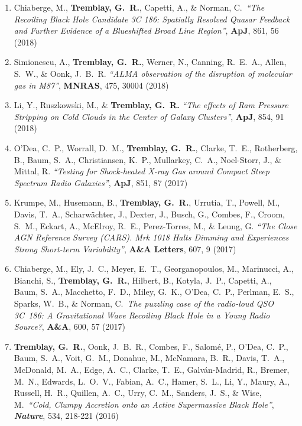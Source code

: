 \documentclass[11pt]{article}
\begin{document}
\begin{enumerate}
\item Chiaberge, M., \textbf{Tremblay, G.~R.}, Capetti, A., \& Norman, C.~\textit{``The Recoiling Black Hole Candidate 3C 186: Spatially Resolved Quasar Feedback and Further Evidence of a Blueshifted Broad Line Region''},
\textbf{ApJ}, 861, 56 (2018)


\item Simionescu, A., \textbf{Tremblay, G.~R.}, Werner, N., Canning, R.~E.~A., Allen, S.~W., \& Oonk, J.~B.~R.
\textit{``ALMA observation of the disruption of
molecular gas in M87''}, \textbf{MNRAS}, 475, 30004 (2018)


\item Li, Y., Ruszkowski, M., \& \textbf{Tremblay, G.~R.} \textit{``The effects of Ram Pressure Stripping on Cold Clouds in the Center of Galaxy Clusters''}, \textbf{ApJ}, 854, 91 (2018)


\item O'Dea, C.~P., Worrall, D.~M., \textbf{Tremblay, G.~R.}, Clarke, T.~E., Rotherberg, B., Baum, S.~A.,
Christiansen, K.~P., Mullarkey, C.~A., Noel-Storr,
J., \& Mittal, R. \textit{``Testing for Shock-heated X-ray Gas around Compact Steep Spectrum Radio Galaxies''}, \textbf{ApJ}, 851, 87 (2017)


\item Krumpe, M., Husemann, B., \textbf{Tremblay, G.~R.}, Urrutia, T., Powell, M., Davis, T.~A., Scharw\"{a}chter, J., Dexter, J., Busch, G., Combes, F., Croom, S.~M.,
Eckart, A., McElroy, R.~E., Perez-Torres, M., \& Leung, G. \textit{``The Close AGN Reference Survey (CARS). Mrk 1018 Halts Dimming and Experiences Strong Short-term Variability''}, \textbf{A\&A Letters}, 607, 9 (2017)



\item Chiaberge, M., Ely, J.~C., Meyer, E.~T., Georganopoulos, M., Marinucci, A., Bianchi, S.,  \textbf{Tremblay, G.~R.}, Hilbert, B.,
Kotyla, J.~P., Capetti, A., Baum, S.~A.,  Macchetto, F.~D., Miley, G.~K.,
O'Dea, C.~P., Perlman, E.~S., Sparks, W.~B., \& Norman, C.\ \textit{The puzzling case of the radio-loud QSO 3C~186: A Gravitational Wave Recoiling Black Hole in a Young Radio Source?}, \textbf{A\&A}, 600, 57 (2017)


\item \textbf{Tremblay, G.~R.}, Oonk, J.~B.~R., Combes, F., Salom\'{e}, P., O'Dea, C.~P., Baum, S.~A., Voit, G.~M., Donahue, M., McNamara, B.~R., Davis, T.~A., McDonald, M.~A., Edge, A.~C., Clarke, T.~E., Galv\'{a}n-Madrid, R., Bremer, M.~N., Edwards, L.~O.~V., Fabian, A.~C.,  Hamer, S.~L., Li, Y., Maury, A., Russell, H.~R., Quillen, A.~C., Urry, C.~M., Sanders, J.~S., \& Wise, M.\ \textit{``Cold, Clumpy Accretion onto an Active Supermassive Black Hole''}, \textit{\textbf{Nature}},  534, 218-221 (2016)



\end{enumerate}
\end{document}
